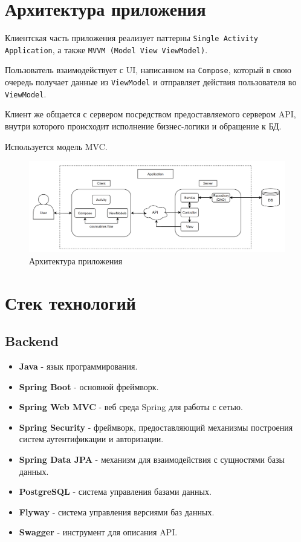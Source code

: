 \documentclass[a4paper, 14pt]{article}
\begin{document}
\section{Архитектура приложения}

Клиентская часть приложения реализует паттерны \texttt{Single Activity Application}, а также \texttt{MVVM (Model View ViewModel)}.

Пользователь взаимодействует с UI, написанном на \texttt{Compose}, который в свою очередь получает данные из \texttt{ViewModel} и отправляет действия пользователя во \texttt{ViewModel}.

Клиент же общается с сервером посредством предоставляемого сервером API, внутри которого происходит исполнение бизнес-логики и обращение к БД.

Используется модель MVC.

\begin{figure}[H]
    \centering
    \includegraphics[width=19cm]{resources/2.png}
    \caption{Архитектура приложения}
\end{figure}

\section{Стек технологий}

\subsection{Backend}

\begin{itemize}
    \item \textbf{Java} - язык программирования.
    \item \textbf{Spring Boot} - основной фреймворк.
    \item \textbf{Spring Web MVC} - веб среда Spring для работы с сетью.
    \item \textbf{Spring Security} - фреймворк, предоставляющий механизмы построения систем аутентификации и авторизации.
    \item \textbf{Spring Data JPA} - механизм для взаимодействия с сущностями базы данных.
    \item \textbf{PostgreSQL} - система управления базами данных.
    \item \textbf{Flyway} - система управления версиями баз данных.
    \item \textbf{Swagger} - инструмент для описания API.
\end{itemize}
\end{document}
